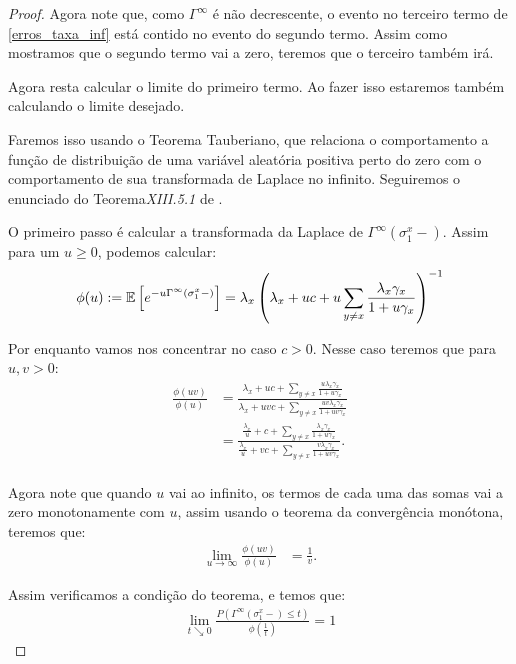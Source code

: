 \begin{proof}
  Agora note que, como $\Gamma^\infty$ é não decrescente, o evento no
  terceiro termo de \eqref{erros_taxa_inf} está contido no evento do
  segundo termo. Assim como mostramos que o segundo termo vai a zero,
  teremos que o terceiro também irá.

  Agora resta calcular o limite do primeiro termo. Ao fazer isso
  estaremos também calculando o limite desejado.


  Faremos isso usando o Teorema Tauberiano, que relaciona o
  comportamento a função de distribuição de uma variável aleatória
  positiva perto do zero com o comportamento de sua transformada de
  Laplace no infinito.  Seguiremos o enunciado do
  Teorema\emph{XIII.5.1} de \cite{fellerv2}.

  O primeiro passo é calcular a transformada da Laplace de
  $\Gamma^\infty(\sigma^x_1-)$. Assim para um $u \geq 0$, podemos
  calcular:
  \begin{align*}
    \phi (u) := {\mathbb{E}} \left[ e^{-u \Gamma^\infty (\sigma^x_1-)}  \right] =
    \lambda_x \left( \lambda_x + uc + u \sum_{y \neq x}
      \frac{\lambda_x \gamma_x}{1 + u\gamma_x}  \right)^{-1}
  \end{align*}

  Por enquanto vamos nos concentrar no caso $c > 0$. Nesse caso
  teremos que para $u, v > 0$:
  \begin{align*}
    \frac{\phi(uv)}{\phi (u)} &= \frac{\lambda_x + uc + \sum_{y \neq
        x} \frac{u \lambda_x\gamma_x}{1 + u \gamma_x}} {\lambda_x + u
      v c + \sum_{y \neq x} \frac{u v
        \lambda_x\gamma_x}{1 + u v \gamma_x}} \\
    &= \frac{\frac{\lambda_x}{u} + c + \sum_{y \neq x}
      \frac{\lambda_x\gamma_x}{1 + u \gamma_x}} {\frac{\lambda_x}{u} +
      v c + \sum_{y \neq x} \frac{v
        \lambda_x\gamma_x}{1 + u v \gamma_x}}. \\
  \end{align*}

  Agora note que quando $u$ vai ao infinito, os termos de cada uma das
  somas vai a zero monotonamente com $u$, assim usando o teorema da
  convergência monótona, teremos que:
  \begin{align*}
      \lim_{u \to \infty} \frac{\phi(uv)}{\phi (u)} &= \frac{1}{v}.
  \end{align*}

  Assim verificamos a condição do teorema, e temos que:
  \begin{align*}
    \lim_{t \searrow 0} \frac{P( \Gamma^\infty(\sigma^x_1-) \leq
      t)}{\phi(\frac{1}{t})} = 1
  \end{align*}


\end{proof}
